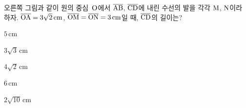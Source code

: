 \noindent\begin{minipage}[t]{0.58\linewidth}\vspace{0pt}\raggedright 오른쪽 그림과 같이 원의 중심~$\mathrm{O}$에서 $\overline{\mathrm{AB}}$, $\overline{\mathrm{CD}}$에 내린 수선의 발을 각각 $\mathrm{M}$, $\mathrm{N}$이라 하자. $\overline{\mathrm{OA}}=3\sqrt{2}\,\mathrm{cm}$, $\overline{\mathrm{OM}}=\overline{\mathrm{ON}}=3\,\mathrm{cm}$일 때, $\overline{\mathrm{CD}}$의 길이는?\end{minipage}\hfill\begin{minipage}[t]{0.4\linewidth}\vspace{0pt}\centering \resizebox{\ifdim\width>\linewidth\linewidth\else\width\fi}{!}{}\end{minipage}\par
\begin{choices32}{\rule[-3ex]{0pt}{8ex}$5\,\mathrm{cm}$}{\rule[-3ex]{0pt}{8ex}$3\sqrt{3}\,\mathrm{cm}$}{\rule[-3ex]{0pt}{8ex}$4\sqrt{2}\,\mathrm{cm}$}{\rule[-3ex]{0pt}{8ex}$6\,\mathrm{cm}$}{\rule[-3ex]{0pt}{8ex}$2\sqrt{10}\,\mathrm{cm}$}\end{choices32}

